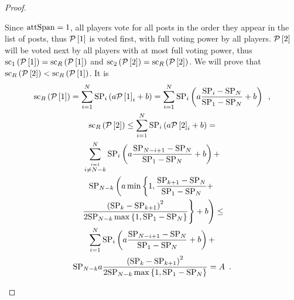 \begin{proof}
\begin{itemize}
    Since $\mathrm{attSpan} = 1$, all players vote for all posts in the order they
    appear in the list of posts, thus $\mathcal{P}\left[1\right]$ is voted first,
    with full voting power by all players. $\mathcal{P}\left[2\right]$ will be
    voted next by all players with at most full voting power, thus
    $\mathrm{sc}_1\left(\mathcal{P}\left[1\right]\right) =
    \mathrm{sc}_R\left(\mathcal{P}\left[1\right]\right)$ and
    $\mathrm{sc}_2\left(\mathcal{P}\left[2\right]\right) =
    \mathrm{sc}_R\left(\mathcal{P}\left[2\right]\right)$. We will prove that
    $\mathrm{sc}_R\left(\mathcal{P}\left[2\right]\right) <
    \mathrm{sc}_R\left(\mathcal{P}\left[1\right]\right)$. It is
    \begin{gather*}
      \mathrm{sc}_R\left(\mathcal{P}\left[1\right]\right) = \sum\limits_{i =
      1}^N \mathrm{SP}_i\left(a \mathcal{P}\left[1\right]_i + b\right) =
      \sum\limits_{i = 1}^N \mathrm{SP}_i\left(a \frac{\mathrm{SP}_i -
      \mathrm{SP}_N}{\mathrm{SP}_1 - \mathrm{SP}_N} + b\right) \enspace, \\
      \mathrm{sc}_R\left(\mathcal{P}\left[2\right]\right) \leq
      \sum\limits_{i = 1}^N \mathrm{SP}_i\left(a \mathcal{P}\left[2\right]_i +
      b\right) = \\
      \sum\limits_{\overset{i = 1}{i \neq N - k}}^N
      \mathrm{SP}_i\left(a \frac{\mathrm{SP}_{N - i + 1} -
      \mathrm{SP}_N}{\mathrm{SP}_1 - \mathrm{SP}_N} + b\right) + \\
      \mathrm{SP}_{N - k}\left(a \min\left\{1, \frac{\mathrm{SP}_{k + 1} -
      \mathrm{SP}_N}{\mathrm{SP}_1 - \mathrm{SP}_N} + \right.\right. \\
      \left.\left. \frac{\left(\mathrm{SP}_k -
      \mathrm{SP}_{k+1}\right)^2}{2\mathrm{SP}_{N - k}\max{\left\{1, \mathrm{SP}_1 -
      \mathrm{SP}_N\right\}}}\right\} + b\right) \leq \\
      \sum\limits_{i = 1}^N \mathrm{SP}_i\left(a \frac{\mathrm{SP}_{N -
      i + 1} - \mathrm{SP}_N}{\mathrm{SP}_1 - \mathrm{SP}_N} + b\right) + \\
      \mathrm{SP}_{N - k} a \frac{\left(\mathrm{SP}_k -
      \mathrm{SP}_{k+1}\right)^2}{2\mathrm{SP}_{N - k}\max{\left\{1, \mathrm{SP}_1 -
      \mathrm{SP}_N\right\}}} = A \enspace.
    \end{gather*}


\end{itemize}
\end{proof}
